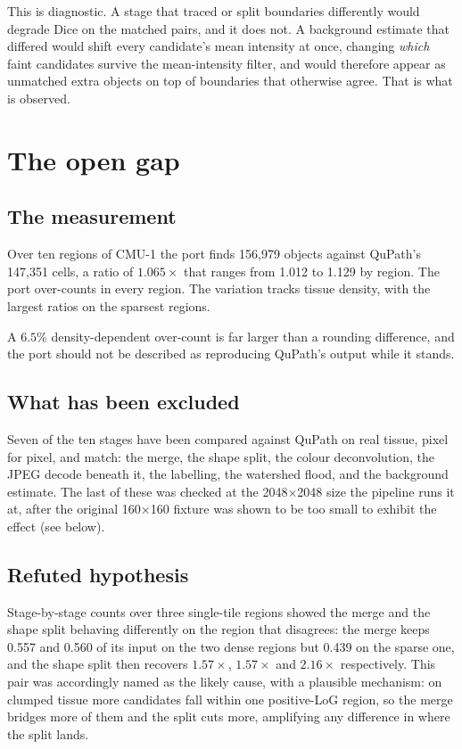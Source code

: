 \documentclass[11pt,a4paper]{article}
\begin{document}
This is diagnostic. A stage that traced or split boundaries differently would
degrade Dice on the matched pairs, and it does not. A background estimate that
differed would shift every candidate's mean intensity at once, changing
\emph{which} faint candidates survive the mean-intensity filter, and would
therefore appear as unmatched extra objects on top of boundaries that otherwise
agree. That is what is observed.

\section{The open gap}
\label{sec:gap}

\subsection{The measurement}

Over ten regions of CMU-1 the port finds 156{,}979 objects against QuPath's
147{,}351 cells, a ratio of $1.065\times$ that ranges from 1.012 to 1.129 by
region. The port over-counts in every region. The variation tracks tissue
density, with the largest ratios on the sparsest regions.

A $6.5\%$ density-dependent over-count is far larger than a rounding
difference, and the port should not be described as reproducing QuPath's output
while it stands.

\subsection{What has been excluded}

Seven of the ten stages have been compared against QuPath on real tissue, pixel
for pixel, and match: the merge, the shape split, the colour deconvolution, the
JPEG decode beneath it, the labelling, the watershed flood, and the background
estimate. The last of these was checked at the 2048$\times$2048 size the
pipeline runs it at, after the original 160$\times$160 fixture was shown to be
too small to exhibit the effect (see below).

\subsection{Refuted hypothesis}

Stage-by-stage counts over three single-tile regions showed the merge and the
shape split behaving differently on the region that disagrees: the merge keeps
0.557 and 0.560 of its input on the two dense regions but 0.439 on the sparse
one, and the shape split then recovers $1.57\times$, $1.57\times$ and
$2.16\times$ respectively. This pair was accordingly named as the likely cause,
with a plausible mechanism: on clumped tissue more candidates fall within one
positive-LoG region, so the merge bridges more of them and the split cuts more,
amplifying any difference in where the split lands.
\end{document}
